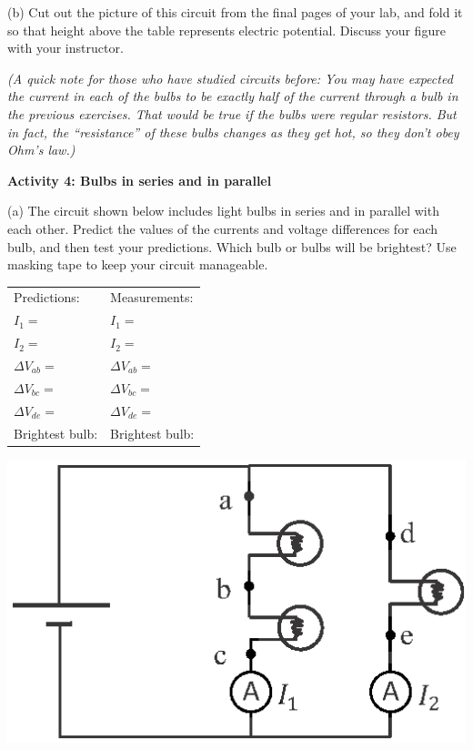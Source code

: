 (b) Cut out the picture of this circuit from the final pages of your lab, and fold it so that height above the table represents electric potential.  Discuss your figure with your instructor. 

\textit{(A quick note for those who have studied circuits before:  You may have expected the current in each of the bulbs to be exactly half of the current through a bulb in the previous exercises.  That would be true if the bulbs were regular resistors.  But in fact, the ``resistance'' of these bulbs changes as they get hot, so they don't obey Ohm's law.)}

\textbf{Activity 4: Bulbs in series and in parallel} \par
\nopagebreak
(a) The circuit shown below includes light bulbs in series and in parallel with each other.  Predict the values of the currents and voltage differences for each bulb, and then test your predictions.  Which bulb or bulbs will be brightest? Use masking tape to keep your circuit manageable.


\begin{minipage}{0.6\textwidth}
\vspace{0.1 in}
{\renewcommand{\arraystretch}{1.6}
\hspace*{0.5in}
\begin{tabular}{l l}
Predictions: \hspace{0.7in} & Measurements: \\
$I_1 =$ & $I_1 =$ \\
$I_2 =$ & $I_2 =$ \\
$\Delta V_{ab} =$ & $\Delta V_{ab} =$ \\
$\Delta V_{bc} =$ & $\Delta V_{bc} =$ \\
$\Delta V_{de} =$ & $\Delta V_{de} =$ \\
Brightest bulb: & Brightest bulb: \\
\end{tabular}}
\vspace{0.3in}
\end{minipage}
\begin{minipage}{0.39\textwidth}
\includegraphics[width=\textwidth]{electric_circuits/circ_diag5.eps}
\end{minipage}


